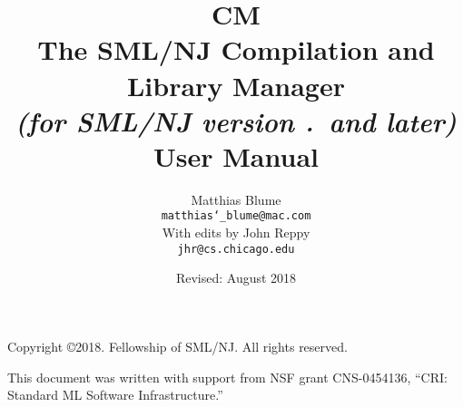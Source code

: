 \documentclass[titlepage,letterpaper]{article}
\author{
  Matthias Blume \\
  \texttt{matthias\char`\_blume@mac.com}\\[0.5em]
  With edits by John Reppy\\
  \texttt{jhr@cs.chicago.edu}}
\date{Revised: August 2018}
\title{
  \textbf{CM}\\
  The SML/NJ Compilation and Library Manager \\
  \textit{\small (for SML/NJ version \smlmj.\smlmn~and later)} \\
  User Manual
}
\begin{document}



\maketitle

\phantom{.}
\thispagestyle{empty}

\noindent Copyright \copyright{}2018.  Fellowship of SML/NJ.  All rights reserved.

\vskip 12pt
\noindent This document was written with support from NSF grant CNS-0454136,
``CRI: Standard ML Software Infrastructure.''

\pagebreak

\tableofcontents

\pagebreak



















\pagebreak



\pagebreak

\appendix









\end{document}
